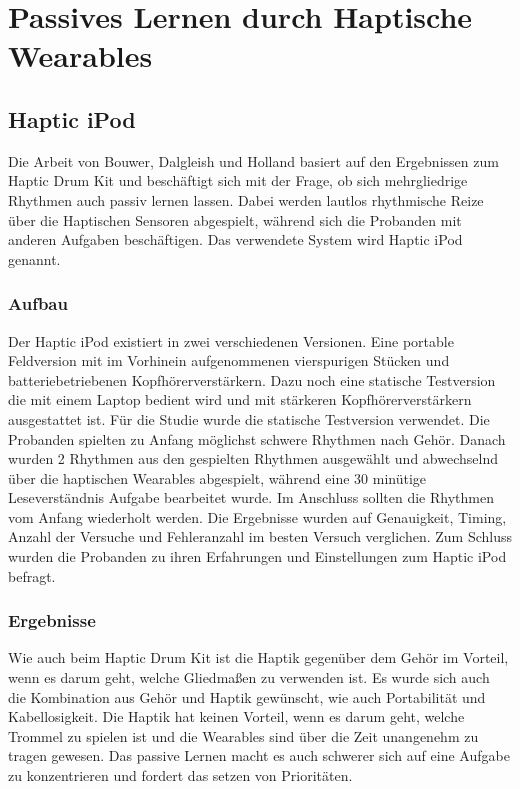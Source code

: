 \documentclass[ngerman,runningheads,a4paper]{llncs}
\begin{document}
\section{Passives Lernen durch Haptische Wearables}

\subsection{Haptic iPod}
Die Arbeit von Bouwer, Dalgleish und Holland\cite{bouwer2011haptic} basiert auf den Ergebnissen zum Haptic Drum Kit \cite{10.1145/1709886.1709892} und beschäftigt sich mit der Frage, ob sich mehrgliedrige Rhythmen auch passiv lernen lassen.
Dabei werden lautlos rhythmische Reize über die Haptischen Sensoren abgespielt, während sich die Probanden mit anderen Aufgaben beschäftigen.
Das verwendete System wird Haptic iPod genannt.
\subsubsection{Aufbau}
Der Haptic iPod existiert in zwei verschiedenen Versionen.
Eine portable Feldversion mit im Vorhinein aufgenommenen vierspurigen Stücken und batteriebetriebenen Kopfhörerverstärkern.
Dazu noch eine statische Testversion die mit einem Laptop bedient wird und mit stärkeren Kopfhörerverstärkern ausgestattet ist.
Für die Studie wurde die statische Testversion verwendet.
Die Probanden spielten zu Anfang möglichst schwere Rhythmen nach Gehör.
Danach wurden 2 Rhythmen aus den gespielten Rhythmen ausgewählt und abwechselnd über die haptischen Wearables abgespielt, während eine 30 minütige Leseverständnis Aufgabe bearbeitet wurde.
Im Anschluss sollten die Rhythmen vom Anfang wiederholt werden.
Die Ergebnisse wurden auf Genauigkeit, Timing, Anzahl der Versuche und Fehleranzahl im besten Versuch verglichen.
Zum Schluss wurden die Probanden zu ihren Erfahrungen und Einstellungen zum Haptic iPod befragt.

\subsubsection{Ergebnisse}
Wie auch beim Haptic Drum Kit \cite{10.1145/1709886.1709892} ist die Haptik gegenüber dem Gehör im Vorteil, wenn es darum geht, welche Gliedmaßen zu verwenden ist.
Es wurde sich auch die Kombination aus Gehör und Haptik gewünscht, wie auch Portabilität und Kabellosigkeit.
Die Haptik hat keinen Vorteil, wenn es darum geht, welche Trommel zu spielen ist und die Wearables sind über die Zeit unangenehm zu tragen gewesen.
Das passive Lernen macht es auch schwerer sich auf eine Aufgabe zu konzentrieren und fordert das setzen von Prioritäten.
\end{document}
